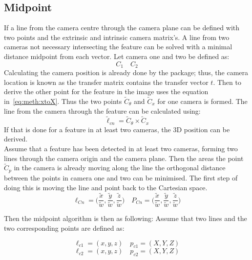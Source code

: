 \subsection{Midpoint}%
\label{sub:Midpoint}
If a line from the camera centre through the camera plane can be defined with two points and the extrinsic and intrinsic camera matrix's.
A line from two cameras not necessary intersecting the feature can be solved with a minimal distance midpoint from each vector.
Let camera one and two be defined as:
\begin{equation}
    C_1 \quad C_2
\end{equation}
Calculating the camera position is already done by the \aruco package; thus, the camera location is known as the transfer matrix contains the transfer vector $t$.
Then to derive the other point for the feature in the image uses the equation in~\ref{eq:meth:xtoX}.
Thus the two points $\tilde{C}_\theta$ and $\tilde{C}_x$ for one camera is formed.
The line from the camera through the feature can be calculated using:
\begin{equation}
    \tilde{\ell}_{cn} = \tilde{C}_\theta \times \tilde{C}_x
\end{equation}
If that is done for a feature in at least two cameras, the 3D position can be derived.\\
Assume that a feature has been detected in at least two cameras, forming two lines through the camera origin and the camera plane.
Then the areas the point $\tilde{C}_p$ in the camera is already moving along the line the orthogonal distance between the points in camera one and two can be minimised.
The first step of doing this is moving the line and point back to the Cartesian space.
\begin{equation}
    \ell_{Cn} = \big( \frac{\tilde x}{\tilde w}, \frac{\tilde y}{\tilde w}, \frac{\tilde z}{\tilde w} \big)
    \quad
    P_{Cn} = \big( \frac{\tilde x}{\tilde w}, \frac{\tilde y}{\tilde w}, \frac{\tilde z}{\tilde w} \big)
\end{equation}

Then the midpoint algorithm is then as following:
Assume that two lines and the two corresponding points are defined as:

\begin{equation}
    \ell_{c1} = (x,y,z) \quad p_{c1} = (X,Y,Z)
\end{equation}
\begin{equation}
    \ell_{c2} = (x,y,z) \quad p_{c2} = (X,Y,Z)
\end{equation}

